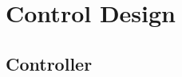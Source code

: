 \part{Control Design}
\label{control_design}

\chapter{Controller}
\label{Controller}









	














	